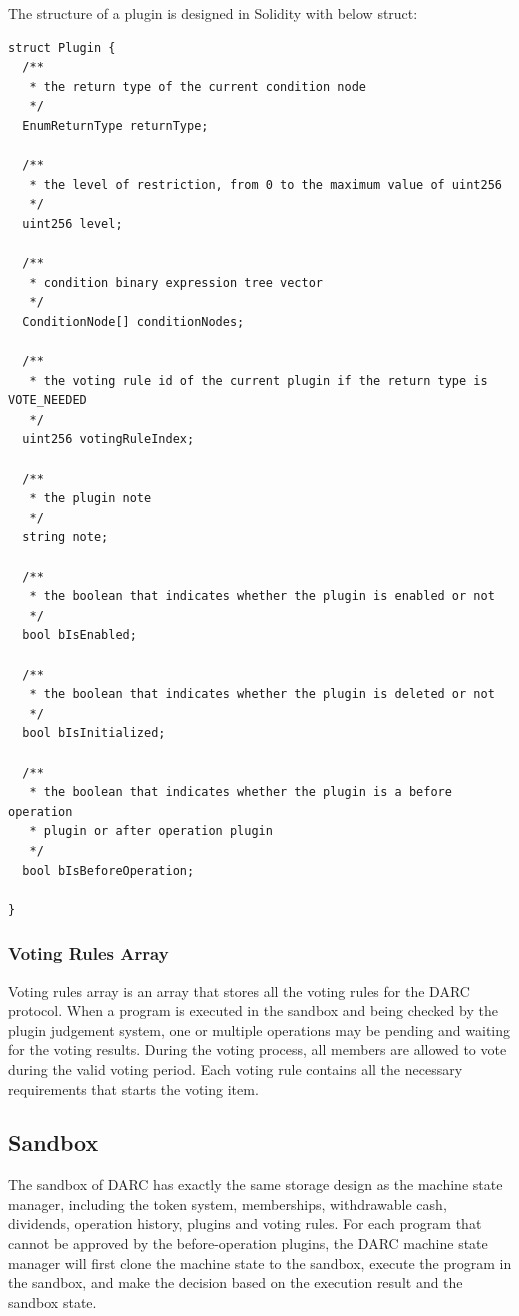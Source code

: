 \documentclass[main.tex]{subfiles}
\begin{document}
The structure of a plugin is designed in Solidity with below struct:

\begin{verbatim}
struct Plugin {
  /**
   * the return type of the current condition node
   */
  EnumReturnType returnType;

  /**
   * the level of restriction, from 0 to the maximum value of uint256
   */
  uint256 level;

  /**
   * condition binary expression tree vector
   */
  ConditionNode[] conditionNodes;

  /**
   * the voting rule id of the current plugin if the return type is VOTE_NEEDED
   */
  uint256 votingRuleIndex;

  /**
   * the plugin note
   */
  string note;

  /**
   * the boolean that indicates whether the plugin is enabled or not
   */
  bool bIsEnabled;

  /**
   * the boolean that indicates whether the plugin is deleted or not
   */
  bool bIsInitialized;

  /**
   * the boolean that indicates whether the plugin is a before operation 
   * plugin or after operation plugin
   */
  bool bIsBeforeOperation;
  
}
\end{verbatim}

\subsubsection{Voting Rules Array}

Voting rules array is an array that stores all the voting rules for the DARC protocol. When a program is executed in the sandbox and being checked by the plugin judgement system, one or multiple operations may be pending and waiting for the voting results. During the voting process, all members are allowed to vote during the valid voting period. Each voting rule contains all the necessary requirements that starts the voting item.


\subsection{Sandbox}

The sandbox of DARC has exactly the same storage design as the machine state manager, including the token system, memberships, withdrawable cash, dividends, operation history, plugins and voting rules. For each program that cannot be approved by the before-operation plugins, the DARC machine state manager will first clone the machine state to the sandbox, execute the program in the sandbox, and make the decision based on the execution result and the sandbox state. 
\end{document}
